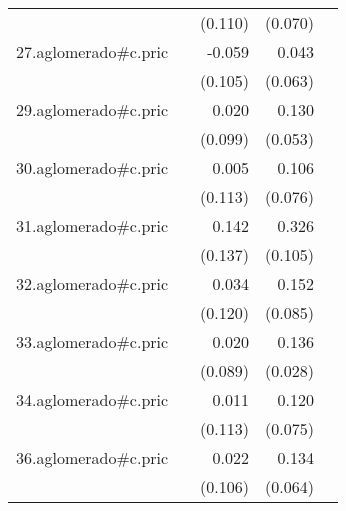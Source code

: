 {\begin{longtable}{l*{4}{D{.}{.}{-1}}}
            &                     &     (0.110)         &     (0.070)         &                     \\
\addlinespace
27.aglomerado#c.pric&                     &      -0.059         &       0.043         &                     \\
            &                     &     (0.105)         &     (0.063)         &                     \\
\addlinespace
29.aglomerado#c.pric&                     &       0.020         &       0.130\sym{*}  &                     \\
            &                     &     (0.099)         &     (0.053)         &                     \\
\addlinespace
30.aglomerado#c.pric&                     &       0.005         &       0.106         &                     \\
            &                     &     (0.113)         &     (0.076)         &                     \\
\addlinespace
31.aglomerado#c.pric&                     &       0.142         &       0.326\sym{**} &                     \\
            &                     &     (0.137)         &     (0.105)         &                     \\
\addlinespace
32.aglomerado#c.pric&                     &       0.034         &       0.152         &                     \\
            &                     &     (0.120)         &     (0.085)         &                     \\
\addlinespace
33.aglomerado#c.pric&                     &       0.020         &       0.136\sym{***}&                     \\
            &                     &     (0.089)         &     (0.028)         &                     \\
\addlinespace
34.aglomerado#c.pric&                     &       0.011         &       0.120         &                     \\
            &                     &     (0.113)         &     (0.075)         &                     \\
\addlinespace
36.aglomerado#c.pric&                     &       0.022         &       0.134\sym{*}  &                     \\
            &                     &     (0.106)         &     (0.064)         &                     \\

\end{longtable}}
